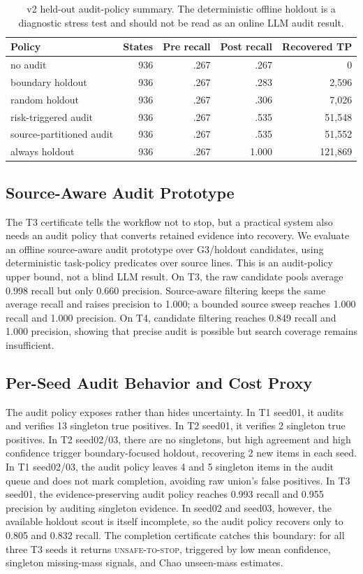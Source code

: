 \documentclass[letterpaper]{article}
\begin{document}
\begin{table}[h]
\centering
\small
\begin{tabular}{lrrrr}
\toprule
Policy & States & Pre recall & Post recall & Recovered TP \\
\midrule
no audit & 936 & .267 & .267 & 0 \\
boundary holdout & 936 & .267 & .283 & 2,596 \\
random holdout & 936 & .267 & .306 & 7,026 \\
risk-triggered audit & 936 & .267 & .535 & 51,548 \\
source-partitioned audit & 936 & .267 & .535 & 51,552 \\
always holdout & 936 & .267 & 1.000 & 121,869 \\
\bottomrule
\end{tabular}
\caption{v2 held-out audit-policy summary. The deterministic offline holdout is
a diagnostic stress test and should not be read as an online LLM audit result.}
\end{table}

\subsection{Source-Aware Audit Prototype}

The T3 certificate tells the workflow not to stop, but a practical system also
needs an audit policy that converts retained evidence into recovery. We evaluate
an offline source-aware audit prototype over G3/holdout candidates, using
deterministic task-policy predicates over source lines. This is an audit-policy
upper bound, not a blind LLM result. On T3, the raw candidate pools average
0.998 recall but only 0.660 precision. Source-aware filtering keeps the same
average recall and raises precision to 1.000; a bounded source sweep reaches
1.000 recall and 1.000 precision. On T4, candidate filtering reaches 0.849
recall and 1.000 precision, showing that precise audit is possible but search
coverage remains insufficient.

\subsection{Per-Seed Audit Behavior and Cost Proxy}

The audit policy exposes rather than hides uncertainty. In T1 seed01, it audits
and verifies 13 singleton true positives. In T2 seed01, it verifies 2 singleton
true positives. In T2 seed02/03, there are no singletons, but high agreement and
high confidence trigger boundary-focused holdout, recovering 2 new items in each
seed. In T1 seed02/03, the audit policy leaves 4 and 5 singleton items in the
audit queue and does not mark completion, avoiding raw union's false positives.
In T3 seed01, the evidence-preserving audit policy reaches 0.993 recall and
0.955 precision by auditing singleton evidence. In seed02 and seed03, however,
the available holdout scout is itself incomplete, so the audit policy recovers
only to 0.805 and 0.832 recall. The completion certificate catches this boundary:
for all three T3 seeds it returns \textsc{unsafe-to-stop}, triggered by low mean
confidence, singleton missing-mass signals, and Chao unseen-mass estimates.
\end{document}

